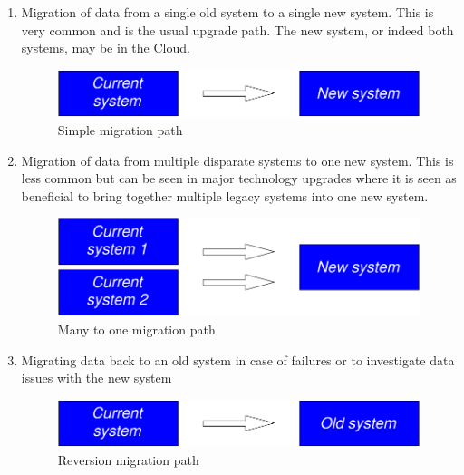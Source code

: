 \begin{enumerate}
\item Migration of data from a single old system to a single new system.
This is very common and is the usual upgrade path.
The new system, or indeed both systems, may be in the Cloud.

\begin{figure}[htbp]
  \centering
  \includegraphics[width=\textwidth/2]{images/migration1.pdf}
  \caption{Simple migration path}
  \label{fig:migration1}
\end{figure}

\item Migration of data from multiple disparate systems to one new system.
This is less common but can be seen in major technology upgrades where it is seen as beneficial to bring together multiple
legacy systems into one new system.

\begin{figure}[htbp]
  \centering
  \includegraphics[width=\textwidth/2]{images/migration2.pdf}
  \caption{Many to one migration path}
  \label{fig:migration2}
\end{figure}

\item Migrating data back to an old system in case of failures or to investigate data issues with the new system

\begin{figure}[htbp]
  \centering
  \includegraphics[width=\textwidth/2]{images/migration3.pdf}
  \caption{Reversion migration path}
  \label{fig:migration3}
\end{figure}

\end{enumerate}
%
